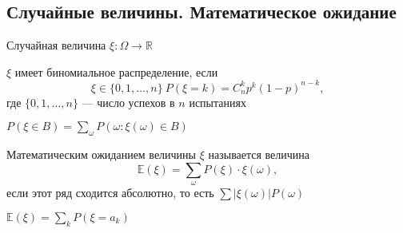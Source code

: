 \documentclass[a4paper, 10pt]{article}
\begin{document}
\subsection{Случайные величины. Математическое ожидание}
 Случайная величина $\xi:\Omega\rightarrow\mathbb{R}$

$\xi$ имеет биномиальное распределение, если
$$\xi\in\{0,1,\ldots,n\}\ P(\xi=k)=C_n^k p^k(1-p)^{n-k},$$
где $\{0,1,\ldots,n\}$ — число успехов в $n$ испытаниях

$P(\xi\in B)=\sum_{\omega} P(\omega:\xi(\omega)\in B)$

 Математическим ожиданием величины $\xi$ называется величина $$\mathbb{E}(\xi)=\sum_{\omega} P(\xi)\cdot\xi(\omega),$$
если этот ряд сходится абсолютно, то есть $\sum\left|\xi(\omega)\right|P(\omega)$

\theorem $\mathbb{E}(\xi)=\sum_{k} P(\xi=a_k)$ 





\end{document}
